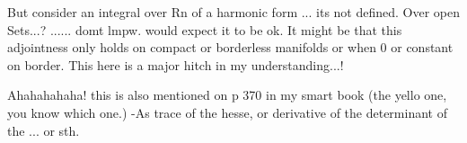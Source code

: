 But consider an integral over Rn of a harmonic form ... its not defined. Over open Sets...? ...... domt lmpw. would expect it to be ok.
It might be that this adjointness only holds on compact or borderless manifolds or when 0 or constant on border. This here is a major hitch in my understanding...! 

Ahahahahaha! this is also mentioned on p 370 in my smart book (the yello one, you know which one.)
-As trace of the hesse, or derivative of the determinant of the ... or sth.